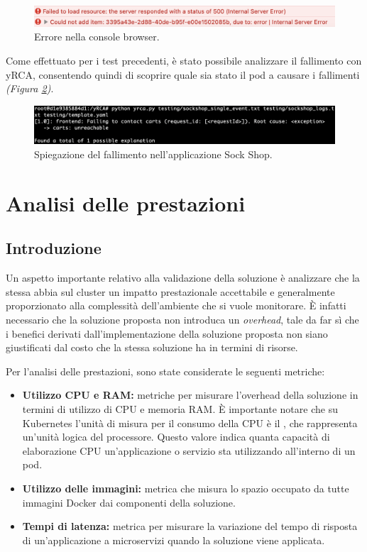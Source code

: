 \begin{figure}[h]
    \centering
    \includegraphics[width=\textwidth]{immagini/capitolo5/browser_error.png}
    \caption{Errore nella console browser.}
    \label{fig:sockshop-error}
\end{figure}

Come effettuato per i test precedenti, è stato possibile analizzare il fallimento con yRCA, consentendo quindi di scoprire quale sia stato il pod a causare i fallimenti \textit{(Figura \ref{fig:sockshop-yrca})}.

\begin{figure}[h]
    \centering
    \includegraphics[width=\textwidth]{immagini/capitolo5/new_sockshop_yrca.png}
    \caption{Spiegazione del fallimento nell'applicazione Sock Shop.}
    \label{fig:sockshop-yrca}
\end{figure}

\section{Analisi delle prestazioni}
\subsection{Introduzione}
Un aspetto importante relativo alla validazione della soluzione è analizzare che la stessa abbia sul cluster un impatto prestazionale accettabile e generalmente proporzionato alla complessità dell'ambiente che si vuole monitorare. È infatti necessario che la soluzione proposta non introduca un \textit{overhead}, tale da far sì che i benefici derivati dall'implementazione della soluzione proposta non siano giustificati dal costo che la stessa soluzione ha in termini di risorse.

Per l'analisi delle prestazioni, sono state considerate le seguenti metriche:

\begin{itemize}
    \item \textbf{Utilizzo CPU e RAM:} metriche per misurare l'overhead della soluzione in termini di utilizzo di CPU e memoria RAM. È importante notare che su Kubernetes l'unità di misura per il consumo della CPU è il , che rappresenta un'unità logica del processore. Questo valore indica quanta capacità di elaborazione CPU un'applicazione o servizio sta utilizzando all'interno di un pod.
    \item \textbf{Utilizzo delle immagini:} metrica che misura lo spazio occupato da tutte immagini Docker dai componenti della soluzione.
    \item \textbf{Tempi di latenza:} metrica per misurare la variazione del tempo di risposta di un'applicazione a microservizi quando la soluzione viene applicata. 

\end{itemize}

